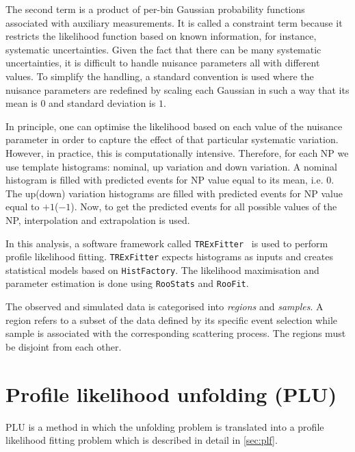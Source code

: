 The second term is a product of per-bin Gaussian probability functions associated with auxiliary measurements.
It is called a constraint term because it restricts the likelihood
function based on known information, for instance, systematic uncertainties. 
Given the fact that there can be many systematic uncertainties, it is difficult to handle
nuisance parameters all with different values. To simplify the handling,
a standard convention is used where the nuisance parameters are redefined
by scaling each Gaussian in such a way that its mean 
is $0$ and standard deviation is $1$.

In principle, one can optimise the likelihood based on each value of the 
nuisance parameter in order to capture the effect of that particular
systematic variation. However, in practice, this is computationally intensive.
Therefore, for each NP we use template histograms: nominal, up variation and down variation.
A nominal histogram is filled with predicted events for NP value equal to its mean, i.e. $0$. 
The up(down) variation histograms are filled with predicted events for NP value equal to $+1$($-1$).
Now, to get the predicted events for all possible values of the NP, interpolation
and extrapolation is used. 

In this analysis, a software framework called \texttt{TRExFitter}~\cite{trex} is 
used to perform profile likelihood fitting. \texttt{TRExFitter} expects 
histograms as inputs and creates statistical models based on \texttt{HistFactory}.
The likelihood maximisation and parameter estimation is done 
using \texttt{RooStats} and \texttt{RooFit}. 

The observed and simulated data is categorised into \textit{regions} and \textit{samples}.
A region refers to a subset of the data defined by its specific event selection while
sample is associated with the corresponding scattering process. The regions must be 
disjoint from each other.  


\section{Profile likelihood unfolding (PLU)}
PLU is a method in which the unfolding problem is translated into a 
profile likelihood fitting problem which is described in detail in \cref{sec:plf}.  

